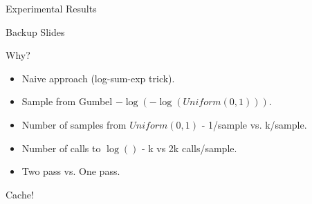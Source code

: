 \begin{frame}{Experimental Results}
\end{frame}

\begin{frame}
  Backup Slides
\end{frame}

\begin{frame}{Why?}
  \begin{itemize}[<+->]
  \item Naive approach (log-sum-exp trick).
  \item Sample from Gumbel $-\log(-\log(Uniform(0,1)))$.
  \item Number of samples from $Uniform(0,1)$ - 1/sample vs. k/sample.
  \item Number of calls to $\log()$ - k vs 2k calls/sample.
  \item Two pass vs. One pass.
  \end{itemize}
  \begin{center}
    Cache!
  \end{center}
\end{frame}
